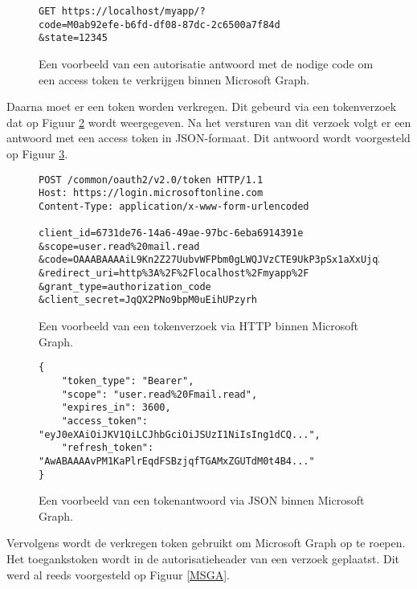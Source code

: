 \begin{figure}[h]
    \footnotesize
    \begin{verbatim}
GET https://localhost/myapp/?
code=M0ab92efe-b6fd-df08-87dc-2c6500a7f84d
&state=12345
    \end{verbatim}    
    \caption[Voorbeeld Microsoft Graph Authorization response]{Een voorbeeld van een autorisatie antwoord met de nodige code om een access token te verkrijgen binnen Microsoft Graph.}
    \label{MSGAR}
\end{figure}

Daarna moet er een token worden verkregen. Dit gebeurd via een tokenverzoek dat op Figuur \ref{HTR} wordt weergegeven. Na het versturen van dit verzoek volgt er een antwoord met een access token in \ac{JSON}-formaat. Dit antwoord wordt voorgesteld op Figuur \ref{HTRES}. \\ 

\begin{figure}[!h]
    \footnotesize\begin{verbatim}
POST /common/oauth2/v2.0/token HTTP/1.1
Host: https://login.microsoftonline.com
Content-Type: application/x-www-form-urlencoded
        
client_id=6731de76-14a6-49ae-97bc-6eba6914391e
&scope=user.read%20mail.read
&code=OAAABAAAAiL9Kn2Z27UubvWFPbm0gLWQJVzCTE9UkP3pSx1aXxUjq3n8b2JRLk4OxVXr...
&redirect_uri=http%3A%2F%2Flocalhost%2Fmyapp%2F
&grant_type=authorization_code
&client_secret=JqQX2PNo9bpM0uEihUPzyrh
    \end{verbatim}    
    \caption[Voorbeeld User Token Request Microsoft Graph]{Een voorbeeld van een tokenverzoek via \ac{HTTP} binnen Microsoft Graph.}
    \label{HTR}
\end{figure}

\begin{figure}[!h]
    \footnotesize\begin{verbatim}
{
    "token_type": "Bearer",
    "scope": "user.read%20Fmail.read",
    "expires_in": 3600,
    "access_token": "eyJ0eXAiOiJKV1QiLCJhbGciOiJSUzI1NiIsIng1dCQ...",
    "refresh_token": "AwABAAAAvPM1KaPlrEqdFSBzjqfTGAMxZGUTdM0t4B4..."
}        
    \end{verbatim}    
    \caption[Voorbeeld User Token Response Microsoft Graph]{Een voorbeeld van een tokenantwoord via \ac{JSON} binnen Microsoft Graph.}
    \label{HTRES}
\end{figure}

Vervolgens wordt de verkregen token gebruikt om Microsoft Graph op te roepen. Het toegankstoken wordt in de autorisatieheader van een verzoek geplaatst. Dit werd al reeds voorgesteld op Figuur \ref{MSGA}. \\

